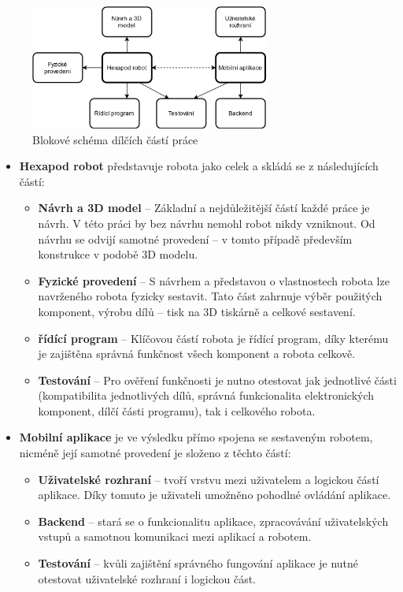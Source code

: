\begin{figure}[hbt]
	\centering
	\includegraphics[width=0.7\textwidth]{obrazky-figures/blockscheme.png}
	\caption{Blokové schéma dílčích částí práce}
    \label{blockscheme}
\end{figure}

\begin{itemize}
    \item \textbf{Hexapod robot} představuje robota jako celek a skládá se z následujících částí:
    \begin{itemize}
        \item \textbf{Návrh a 3D model} -- Základní a nejdůležitější částí každé práce je návrh. V této práci by bez návrhu nemohl robot nikdy vzniknout. Od návrhu se odvijí samotné provedení -- v tomto případě především konstrukce v podobě 3D modelu.
        \item \textbf{Fyzické provedení} -- S návrhem a představou o vlastnostech robota lze navrženého robota fyzicky sestavit. Tato část zahrnuje výběr použitých komponent, výrobu dílů -- tisk na 3D tiskárně a celkové sestavení.
        \item \textbf{řídící program} -- Klíčovou částí robota je řídící program, díky kterému je zajištěna správná funkčnost všech komponent a robota celkově.
        \item \textbf{Testování} -- Pro ověření funkčnosti je nutno otestovat jak jednotlivé části (kompatibilita jednotlivých dílů, správná funkcionalita elektronických komponent, dílčí části programu), tak i celkového robota.
    \end{itemize}
    
    \item \textbf{Mobilní aplikace} je ve výsledku přímo spojena se sestaveným robotem, nicméně její samotné provedení je složeno z těchto částí:
    \begin{itemize}
        \item \textbf{Uživatelské rozhraní} -- tvoří vrstvu mezi uživatelem a logickou částí aplikace. Díky tomuto je uživateli umožněno pohodlné ovládání aplikace.
        \item \textbf{Backend} -- stará se o funkcionalitu aplikace, zpracovávání uživatelských vstupů a samotnou komunikaci mezi aplikací a robotem.
        \item \textbf{Testování} -- kvůli zajištění správného fungování aplikace je nutné otestovat uživatelské rozhraní i logickou část. 
    \end{itemize}
\end{itemize}

